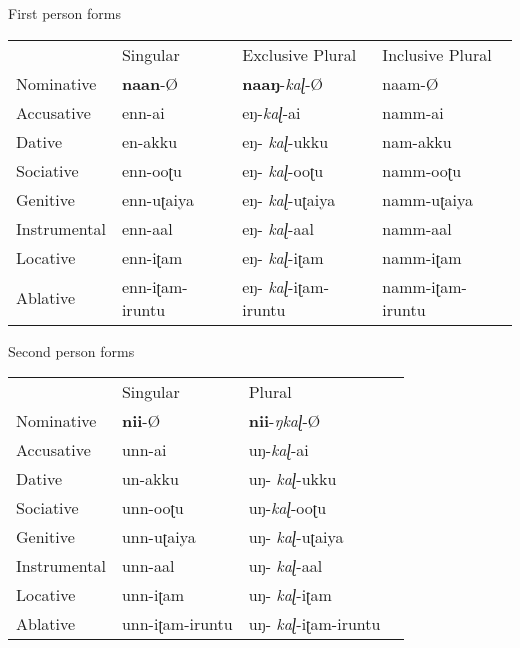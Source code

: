 \documentclass[output=paper,colorlinks,citecolor=brown,
]{langscibook}
\begin{document}
\begin{exe} 
\ex \label{new2}
\begin{xlist}
\ex \label{new2a} First person forms
\begin{table}[ht]
\begin{tabular}{llll}
             & Singular        & Exclusive Plural      & Inclusive Plural \\
Nominative   & \textbf{naan}-Ø          & \textbf{naaŋ}-\textit{kaɭ}-Ø            & naam-Ø           \\
Accusative   & enn-ai          & eŋ-\textit{kaɭ}-ai             & namm-ai          \\
Dative       & en-akku         & eŋ-   \textit{kaɭ}-ukku        & nam-akku         \\
Sociative    & enn-ooʈu        & eŋ-   \textit{kaɭ}-ooʈu        & namm-ooʈu        \\
Genitive     & enn-uʈaiya      & eŋ-   \textit{kaɭ}-uʈaiya      & namm-uʈaiya      \\
Instrumental & enn-aal         & eŋ-   \textit{kaɭ}-aal         & namm-aal         \\
Locative     & enn-iʈam        & eŋ-   \textit{kaɭ}-iʈam        & namm-iʈam        \\
Ablative     & enn-iʈam-iruntu & eŋ-   \textit{kaɭ}-iʈam-iruntu & namm-iʈam-iruntu
\end{tabular}
\end{table}

\ex \label{new2a} Second person forms
\begin{table}[ht]
\begin{tabular}{llll}
             & Singular        & Plural              &  \\
Nominative   & \textbf{nii}-Ø           & \textbf{nii}-\textit{ŋkaɭ}-Ø          &  \\
Accusative   & unn-ai          & uŋ-\textit{kaɭ}-ai           &  \\
Dative       & un-akku         & uŋ- \textit{kaɭ}-ukku        &  \\
Sociative    & unn-ooʈu        & uŋ-\textit{kaɭ}-ooʈu         &  \\
Genitive     & unn-uʈaiya      & uŋ- \textit{kaɭ}-uʈaiya      &  \\
Instrumental & unn-aal         & uŋ- \textit{kaɭ}-aal         &  \\
Locative     & unn-iʈam        & uŋ- \textit{kaɭ}-iʈam        &  \\
Ablative     & unn-iʈam-iruntu & uŋ- \textit{kaɭ}-iʈam-iruntu & 
\end{tabular}
\end{table}


\end{xlist}
\end{exe}
\end{document}
